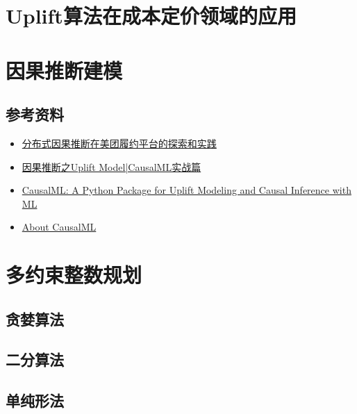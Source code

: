\section{Uplift算法在成本定价领域的应用}
\newpage

\section{因果推断建模}
\subsection{参考资料}
\begin{itemize}
    \item \href{https://tech.meituan.com/2024/01/25/identify-causal-effect.html}
    {分布式因果推断在美团履约平台的探索和实践}
    \item \href{https://www.modb.pro/db/601027}{因果推断之Uplift Model|CausalML实战篇}
    \item \href{https://github.com/uber/causalml}{CausalML: A Python Package for
    Uplift Modeling and Causal Inference with ML}
    \item \href{https://causalml.readthedocs.io/en/latest/about.html}{About 
    CausalML}
\end{itemize}
\newpage

\section{多约束整数规划}
\subsection{贪婪算法}
\subsection{二分算法}
\subsection{单纯形法}
